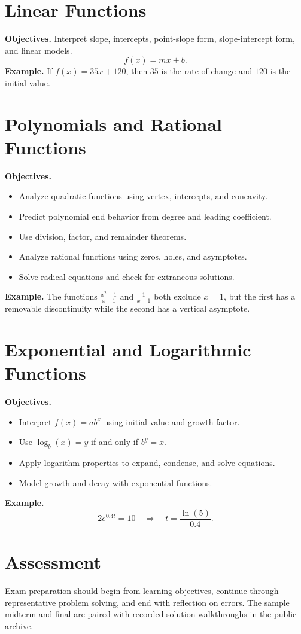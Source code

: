 \documentclass[11pt]{article}
\begin{document}
\section{Linear Functions}
\textbf{Objectives.} Interpret slope, intercepts, point-slope form, slope-intercept form, and linear models.
\[
f(x)=mx+b.
\]
\textbf{Example.} If \(f(x)=35x+120\), then \(35\) is the rate of change and \(120\) is the initial value.

\section{Polynomials and Rational Functions}
\textbf{Objectives.}
\begin{itemize}[noitemsep]
  \item Analyze quadratic functions using vertex, intercepts, and concavity.
  \item Predict polynomial end behavior from degree and leading coefficient.
  \item Use division, factor, and remainder theorems.
  \item Analyze rational functions using zeros, holes, and asymptotes.
  \item Solve radical equations and check for extraneous solutions.
\end{itemize}
\textbf{Example.} The functions \(\frac{x^2-1}{x-1}\) and \(\frac{1}{x-1}\) both exclude \(x=1\), but the first has a removable discontinuity while the second has a vertical asymptote.

\section{Exponential and Logarithmic Functions}
\textbf{Objectives.}
\begin{itemize}[noitemsep]
  \item Interpret \(f(x)=ab^x\) using initial value and growth factor.
  \item Use \(\log_b(x)=y\) if and only if \(b^y=x\).
  \item Apply logarithm properties to expand, condense, and solve equations.
  \item Model growth and decay with exponential functions.
\end{itemize}
\textbf{Example.}
\[
2e^{0.4t}=10 \quad \Longrightarrow \quad t=\frac{\ln(5)}{0.4}.
\]

\section{Assessment}
Exam preparation should begin from learning objectives, continue through representative problem solving, and end with reflection on errors. The sample midterm and final are paired with recorded solution walkthroughs in the public archive.
\end{document}
